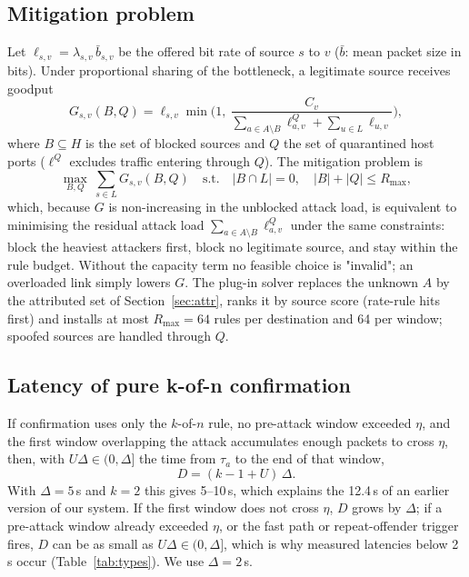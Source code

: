 \documentclass[conference]{IEEEtran}
\begin{document}
\subsection{Mitigation problem}
Let $\ell_{s,v}=\lambda_{s,v}\,\bar b_{s,v}$ be the offered bit rate of source $s$ to $v$ ($\bar b$: mean packet size in bits). Under proportional sharing of the bottleneck, a legitimate source receives goodput
\begin{equation}
G_{s,v}(B,Q)=\ell_{s,v}\min\!\Big(1,\ \frac{C_v}{\sum_{a\in A\setminus B}\ell^{Q}_{a,v}+\sum_{u\in L}\ell_{u,v}}\Big),
\end{equation}
where $B\subseteq H$ is the set of blocked sources and $Q$ the set of quarantined host ports ($\ell^Q$ excludes traffic entering through $Q$). The mitigation problem is
\begin{equation}
\max_{B,Q}\ \sum_{s\in L}G_{s,v}(B,Q)\quad\text{s.t.}\quad |B\cap L|=0,\quad |B|+|Q|\le R_{\max}, \label{eq:mitig}
\end{equation}
which, because $G$ is non-increasing in the unblocked attack load, is equivalent to minimising the residual attack load $\sum_{a\in A\setminus B}\ell^{Q}_{a,v}$ under the same constraints: block the heaviest attackers first, block no legitimate source, and stay within the rule budget. Without the capacity term no feasible choice is "invalid"; an overloaded link simply lowers $G$. The plug-in solver replaces the unknown $A$ by the attributed set of Section~\ref{sec:attr}, ranks it by source score (rate-rule hits first) and installs at most $R_{\max}=64$ rules per destination and 64 per window; spoofed sources are handled through $Q$.

\subsection{Latency of pure k-of-n confirmation}
If confirmation uses only the $k$-of-$n$ rule, no pre-attack window exceeded $\eta$, and the first window overlapping the attack accumulates enough packets to cross $\eta$, then, with $U\Delta\in(0,\Delta]$ the time from $\tau_a$ to the end of that window,
\begin{equation}
D=(k-1+U)\,\Delta. \label{eq:lat}
\end{equation}
With $\Delta=5$\,s and $k=2$ this gives 5--10\,s, which explains the 12.4\,s of an earlier version of our system. If the first window does not cross $\eta$, $D$ grows by $\Delta$; if a pre-attack window already exceeded $\eta$, or the fast path or repeat-offender trigger fires, $D$ can be as small as $U\Delta\in(0,\Delta]$, which is why measured latencies below 2\,s occur (Table~\ref{tab:types}). We use $\Delta=2$\,s.
\end{document}
